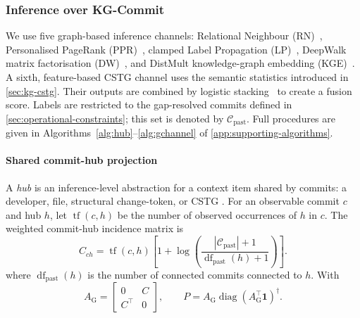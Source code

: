 \documentclass[final,5p,times,twocolumn]{elsarticle}
\DeclareRobustCommand{\code}[1]{%
  \ifmmode
    \text{\normalfont\ttfamily\detokenize{#1}}%
  \else
    {\normalfont\ttfamily\detokenize{#1}}%
  \fi
}
\DeclareRobustCommand{\edge}[1]{\code{#1}}
\DeclareRobustCommand{\node}[1]{\code{#1}}
\theoremstyle{plain}
\begin{document}

\subsubsection{Inference over KG-Commit}
\label{sec:kg-infer}

We use five graph-based inference channels: Relational Neighbour
(RN)~\cite{macskassy2003probabilistic}, Personalised PageRank
(PPR)~\cite{haveliwala2002topic}, clamped Label
Propagation (LP)~\cite{zhu2003semi}, DeepWalk matrix factorisation
(DW)~\cite{perozzi2014deepwalk,qiu2018network}, and DistMult
knowledge-graph embedding (KGE)~\cite{yang2015embedding}. A sixth, feature-based CSTG channel uses the semantic statistics introduced in \autoref{sec:kg-cstg}. Their outputs are combined by logistic stacking~\cite{wolpert1992stacked} to create a fusion score. Labels are restricted to the gap-resolved commits defined in \autoref{sec:operational-constraints}; this set is denoted by $\mathcal{C}_{\mathrm{past}}$. Full procedures are given in Algorithms~\ref{alg:hub}--\ref{alg:gchannel} of \autoref{app:supporting-algorithms}.

\paragraph{Shared commit-hub projection}
A \emph{hub} is an inference-level abstraction for a context item shared by commits: a developer, file, structural change-token, or CSTG \node{Term}. For an observable commit $c$ and hub $h$, let $\operatorname{tf}(c,h)$ be the number of observed occurrences of $h$ in $c$. The weighted commit-hub incidence matrix is
\begin{equation}
C_{ch}
=
\operatorname{tf}(c,h)
\left[
1+
\log\left(
\frac{
|\mathcal{C}_{\mathrm{past}}|+1
}{
\operatorname{df}_{\mathrm{past}}(h)+1
}
\right)
\right].
\end{equation}
where $\operatorname{df}_{\mathrm{past}}(h)$ is the number of connected commits connected to $h$. With
\begin{equation}
A_{\mathrm{G}}
=
\begin{bmatrix}
0 & C\\
C^{\top} & 0
\end{bmatrix},
\qquad
P
=
A_{\mathrm{G}}
\operatorname{diag}
\left(A_{\mathrm{G}}^{\top}\mathbf{1}\right)^{\dagger}.
\end{equation}
\end{document}
